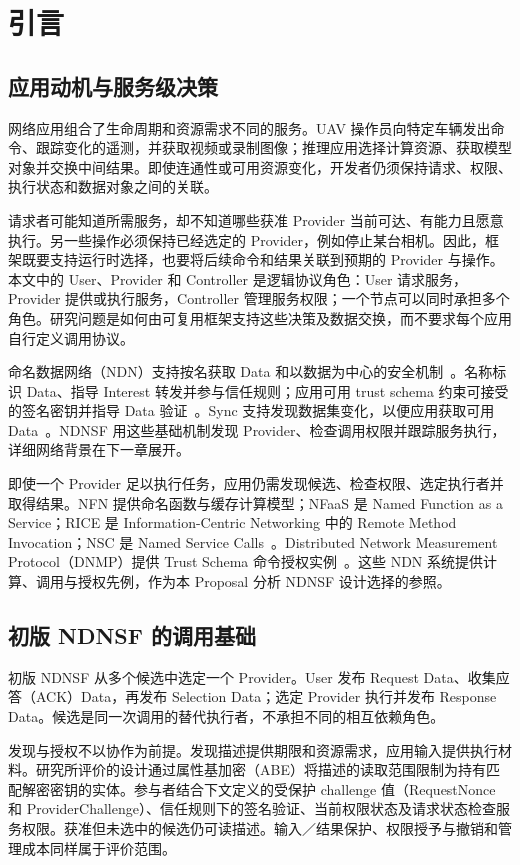 \chapter{引言}
\label{chap:introduction}
\section{应用动机与服务级决策}
网络应用组合了生命周期和资源需求不同的服务。UAV 操作员向特定车辆发出命令、跟踪变化的遥测，并获取视频或录制图像；推理应用选择计算资源、获取模型对象并交换中间结果。即使连通性或可用资源变化，开发者仍须保持请求、权限、执行状态和数据对象之间的关联。

请求者可能知道所需服务，却不知道哪些获准 Provider 当前可达、有能力且愿意执行。另一些操作必须保持已经选定的 Provider，例如停止某台相机。因此，框架既要支持运行时选择，也要将后续命令和结果关联到预期的 Provider 与操作。本文中的 User、Provider 和 Controller 是逻辑协议角色：User 请求服务，Provider 提供或执行服务，Controller 管理服务权限；一个节点可以同时承担多个角色。研究问题是如何由可复用框架支持这些决策及数据交换，而不要求每个应用自行定义调用协议。

命名数据网络（NDN）支持按名获取 Data 和以数据为中心的安全机制~\cite{ndn,ndnpacket}。名称标识 Data、指导 Interest 转发并参与信任规则；应用可用 trust schema 约束可接受的签名密钥并指导 Data 验证~\cite{trustschema}。Sync 支持发现数据集变化，以便应用获取可用 Data~\cite{li2018brief,moll2022sok}。NDNSF 用这些基础机制发现 Provider、检查调用权限并跟踪服务执行，详细网络背景在下一章展开。

即使一个 Provider 足以执行任务，应用仍需发现候选、检查权限、选定执行者并取得结果。NFN 提供命名函数与缓存计算模型；NFaaS 是 Named Function as a Service；RICE 是 Information-Centric Networking 中的 Remote Method Invocation；NSC 是 Named Service Calls~\cite{nfn,nfaas,rice,nsc}。Distributed Network Measurement Protocol（DNMP）提供 Trust Schema 命令授权实例~\cite{dnmp}。这些 NDN 系统提供计算、调用与授权先例，作为本 Proposal 分析 NDNSF 设计选择的参照。

\section{初版 NDNSF 的调用基础}
初版 NDNSF 从多个候选中选定一个 Provider。User 发布 Request Data、收集应答（ACK）Data，再发布 Selection Data；选定 Provider 执行并发布 Response Data。候选是同一次调用的替代执行者，不承担不同的相互依赖角色。

发现与授权不以协作为前提。发现描述提供期限和资源需求，应用输入提供执行材料。研究所评价的设计通过属性基加密（ABE）将描述的读取范围限制为持有匹配解密密钥的实体。参与者结合下文定义的受保护 challenge 值（RequestNonce 和 ProviderChallenge）、信任规则下的签名验证、当前权限状态及请求状态检查服务权限。获准但未选中的候选仍可读描述。输入／结果保护、权限授予与撤销和管理成本同样属于评价范围。


